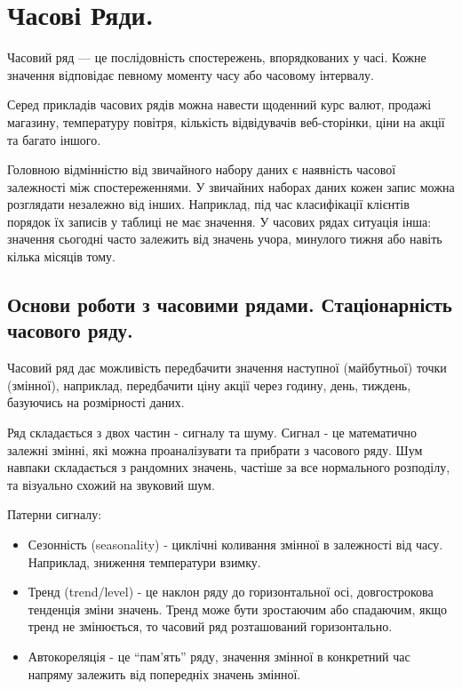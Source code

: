 \chapter{Часові Ряди.}

Часовий ряд — це послідовність спостережень, впорядкованих у часі. Кожне значення відповідає певному моменту часу або часовому інтервалу.

Серед прикладів часових рядів можна навести щоденний курс валют, продажі магазину, температуру повітря, кількість відвідувачів веб-сторінки, ціни на акції та багато іншого.

Головною відмінністю від звичайного набору даних є наявність часової залежності між спостереженнями. У звичайних наборах даних кожен запис можна розглядати незалежно від інших. Наприклад, під час класифікації клієнтів порядок їх записів у таблиці не має значення. У часових рядах ситуація інша: значення сьогодні часто залежить від значень учора, минулого тижня або навіть кілька місяців тому.

\section{Основи роботи з часовими рядами. Стаціонарність часового ряду.}

Часовий ряд дає можливість передбачити значення наступної (майбутньої) точки (змінної), наприклад, передбачити ціну акції через годину, день, тиждень, базуючись на розмірності даних.

Ряд складається з двох частин - сигналу та шуму. Сигнал - це математично залежні змінні, які можна проаналізувати та прибрати з часового ряду. Шум навпаки складається з рандомних значень, частіше за все нормального розподілу, та візуально схожий на звуковий шум.

Патерни сигналу:
\begin{itemize}
\item Сезонність (seasonality) - циклічні коливання змінної в залежності від часу. Наприклад, зниження температури взимку. 
\item Тренд (trend/level) - це наклон ряду до горизонтальної осі, довгострокова тенденція зміни значень. Тренд може бути зростаючим або  спадаючим, якщо тренд не змінюється, то часовий ряд розташований горизонтально.
\item Автокореляція - це “пам’ять” ряду, значення змінної в конкретний час напряму залежить від попередніх значень змінної.
\end{itemize}

